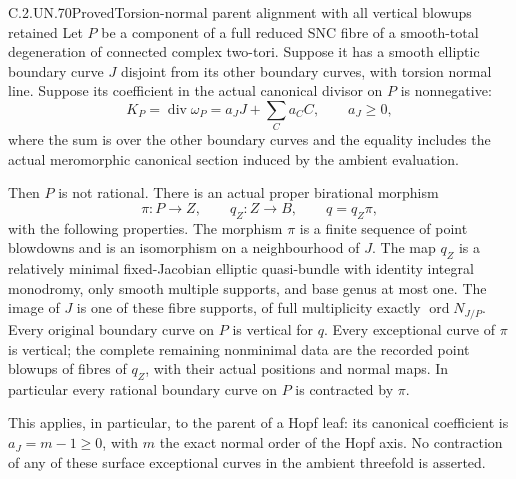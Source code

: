 \begin{statement}{C.2.UN.70}{Proved}{Torsion-normal parent alignment with all vertical blowups retained}
Let \(P\) be a component of a full reduced SNC fibre of
a smooth-total degeneration of connected complex two-tori.
Suppose it has a smooth elliptic boundary curve \(J\)
disjoint from its other boundary curves, with torsion
normal line. Suppose its coefficient in the actual
canonical divisor on \(P\) is nonnegative:
\[
 K_P=\operatorname{div}\omega_P
       =a_JJ+\sum_C a_C C,\qquad a_J\ge0 ,
 \tag{C.NP.1}
\]
where the sum is over the other boundary curves and
the equality includes the actual meromorphic canonical
section induced by the ambient evaluation.

Then \(P\) is not rational. There is an actual proper
birational morphism
\[
 \pi:P\longrightarrow Z,\qquad q_Z:Z\longrightarrow B,
                    \qquad q=q_Z\pi ,
 \tag{C.NP.2}
\]
with the following properties. The morphism \(\pi\)
is a finite sequence of point blowdowns and is an
isomorphism on a neighbourhood of \(J\). The map
\(q_Z\) is a relatively minimal fixed-Jacobian elliptic
quasi-bundle with identity integral monodromy, only
smooth multiple supports, and base genus at most one.
The image of \(J\) is one of these fibre supports,
of full multiplicity exactly
\(\operatorname{ord}N_{J/P}\).
Every original boundary curve on \(P\) is vertical
for \(q\). Every exceptional curve of \(\pi\) is
vertical; the complete remaining nonminimal data
are the recorded point blowups of fibres of \(q_Z\),
with their actual positions and normal maps.
In particular every rational boundary curve on
\(P\) is contracted by \(\pi\).

This applies, in particular, to the parent of a
Hopf leaf: its canonical coefficient is
\(a_J=m-1\ge0\), with \(m\) the exact normal
order of the Hopf axis. No contraction of any
of these surface exceptional curves in the
ambient threefold is asserted.
\end{statement}

